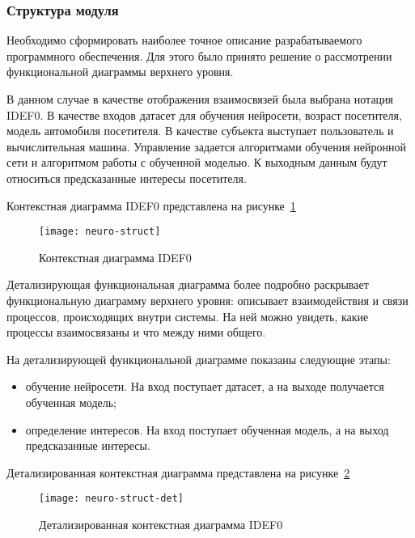 \subsubsection{Структура модуля}

Необходимо сформировать наиболее точное описание разрабатываемого программного обеспечения. Для этого было принято решение о рассмотрении функциональной диаграммы верхнего уровня.

В данном случае в качестве отображения взаимосвязей была выбрана нотация IDEF0. В качестве входов датасет для обучения нейросети, возраст посетителя, модель автомобиля посетителя. В качестве субъекта выступает пользователь и вычислительная машина. Управление задается алгоритмами обучения нейронной сети и алгоритмом работы с обученной моделью. К выходным данным будут относиться предсказанные интересы посетителя.

Контекстная диаграмма IDEF0 представлена на рисунке~\ref{f:neuro-struct}

\begin{figure}[h!]
    \centering
    \vspace{\toppaddingoffigure}
    \texttt{[image: neuro-struct]}
    \caption{Контекстная диаграмма IDEF0}
    \label{f:neuro-struct}
\end{figure}

Детализирующая функциональная диаграмма более подробно раскрывает функциональную диаграмму верхнего уровня: описывает взаимодействия и связи процессов, происходящих внутри системы. На ней можно увидеть, какие процессы взаимосвязаны и что между ними общего.

На детализирующей функциональной диаграмме показаны следующие этапы:
\begin{itemize}
    \item обучение нейросети. На вход поступает датасет, а на выходе получается обученная модель;
    \item определение интересов. На вход поступает обученная модель, а на выход предсказанные интересы.
\end{itemize}

Детализированная контекстная диаграмма представлена на рисунке~\ref{f:neuro-struct-det}

\begin{figure}[h!]
    \centering
    \vspace{\toppaddingoffigure}
    \texttt{[image: neuro-struct-det]}
    \caption{Детализированная контекстная диаграмма IDEF0}
    \label{f:neuro-struct-det}
\end{figure}

